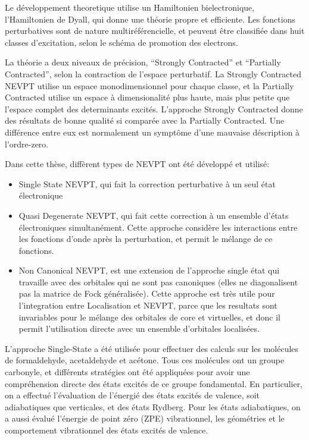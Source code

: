 Le d\'eveloppement theoretique utilise un Hamiltonien bielectronique,
l'Hamiltonien de Dyall, qui donne une th\'eorie propre et efficiente. Les
fonctions perturbatives sont de nature multir\'ef\'erencielle, et peuvent
\^etre classifi\'ee dans huit classes d'excitation, selon le sch\'ema de
promotion des electrons. 

La th\'eorie a deux niveaux de pr\'ecision, ``Strongly Contracted'' et ``Partially
Contracted'', selon la contraction de l'espace perturbatif.
La Strongly Contracted NEVPT utilise un espace monodimensionnel pour chaque
classe, et la Partially Contracted utilise un espace \`a dimensionalit\'e
plus haute, mais plus petite que l'espace complet des determinants
excit\'es.  L'approche Strongly Contracted donne des r\'esultats de bonne
qualit\'e si compar\'ee avec la Partially Contracted. Une diff\'erence entre
eux est normalement un sympt\^ome d'une mauvaise d\'escription \`a
l'ordre-zero.

Dans cette th\`ese, diff\`erent types de NEVPT ont \'et\'e d\'evelopp\'e
et utilis\'e:
\begin{itemize}
\item Single State NEVPT, qui fait la correction perturbative \`a un seul
\'etat \'electronique
\item Quasi Degenerate NEVPT, qui fait cette correction \`a un
ensemble d'\'etats \'electroniques simultan\'ement.  Cette approche
consid\`ere les interactions entre les fonctions d'onde apr\`es la
perturbation, et permit le m\'elange de ce fonctions.
\item Non Canonical NEVPT, est une extension de l'approche single \'etat qui
travaille avec des orbitales qui ne sont pas canoniques (elles ne diagonalisent
pas la matrice de Fock g\'en\'eralis\'ee). Cette approche est tr\`es utile
pour l'integration entre Localisation et NEVPT, parce que les resultats sont
invariables pour le m\'elange des orbitales de core et virtuelles, et donc
il permit l'utilisation directe avec un ensemble d'orbitales localis\'ees.
\end{itemize}

L'approche Single-State a \'et\'e utilis\'ee pour effectuer des calculs sur les
mol\'ecules de formaldehyde, acetaldehyde et ac\'etone. Tous ces mol\'ecules ont
un groupe carbonyle, et diff\'erents strat\'egies ont \'et\'e appliqu\'ees pour avoir
une compr\'ehension directe des \'etats excit\'es de ce groupe fondamental. En
particulier, on a effectu\'e l'\'evaluation de l'\'energi\'e des \'etats
excit\'es de valence, soit adiabatiques que verticales, et des \'etats
Rydberg. Pour les \'etats adiabatiques, on a aussi \'evalu\'e l'\'energie
de point z\'ero (ZPE) vibrationnel, les g\'eom\'etries et le comportement
vibrationnel des \'etats excit\'es de valence.

